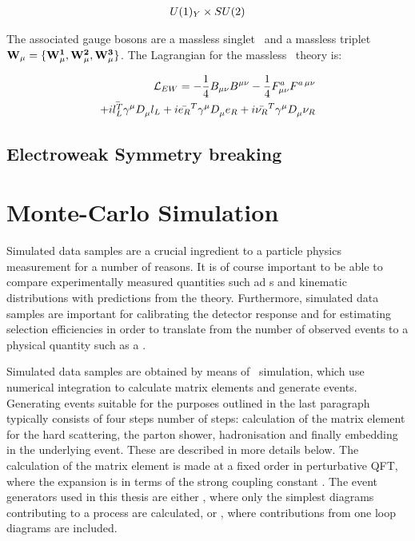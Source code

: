 \begin{align}
U(1)_{Y} \times SU(2) \\
\end{align}

The associated gauge bosons are a massless singlet \Bmu\ and a massless triplet
$\bf W_{\mu} = \{W^{1}_{\mu}, W^{2}_{\mu}, W^{3}_{\mu}\}$. The Lagrangian for the massless \ew\
theory is:

\begin{align}
\mathcal{L}_{EW} = - \frac{1}{4} B_{\mu\nu} B^{\mu\nu} - \frac{1}{4} F^{a}_{\mu\nu}
F^{a\,\mu\nu} \\
+ i \bar{l_{L}^{T}} \gamma^{\mu} D_{\mu}^{} l_{L} + i  \bar{e_{R}}^{T} \gamma^{\mu}
D_{\mu}^{} e_{R} + i \bar{\nu_{R}}^{T} \gamma^{\mu} D_{\mu}^{} \nu_{R}
\end{align}

\subsection{Electroweak Symmetry breaking}

\section{Monte-Carlo Simulation}
\label{sec:Theory-MC}

Simulated data samples are a crucial ingredient to a particle physics
measurement for a number of reasons. It is of course important to be able to
compare experimentally measured quantities such ad \cx s and kinematic
distributions with predictions from the theory. Furthermore, simulated data
samples are important for calibrating the detector response and for estimating
selection efficiencies in order to translate from the number of observed events
to a physical quantity such as a \cx. 

Simulated data samples are obtained by
means of \mc\ simulation, which use numerical integration to calculate matrix
elements and generate events. Generating events suitable for the purposes
outlined in the last paragraph typically consists of four steps number of steps:
calculation of the matrix element for the hard scattering, the parton shower,
hadronisation and finally embedding in the underlying event. These are described
in more details below. The calculation of the matrix element is
made at a fixed order in perturbative QFT, where the expansion is in terms of
the strong coupling constant \alphaS. The event generators used in this thesis
are either \intro{Leading Order (LO)}, where only the simplest diagrams
contributing to a process are calculated, or ,
where contributions from one loop diagrams are included. 


